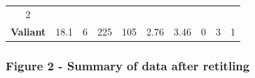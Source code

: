 \documentclass[]{article}
\begin{document}
\begin{longtable}[c]{@{}cccccccccc@{}}
\begin{minipage}[t]{0.06\columnwidth}
2
\strut\end{minipage}\tabularnewline
\begin{minipage}[t]{0.22\columnwidth}\centering\strut
\textbf{Valiant}
\strut\end{minipage} &
\begin{minipage}[t]{0.06\columnwidth}\centering\strut
18.1
\strut\end{minipage} &
\begin{minipage}[t]{0.06\columnwidth}\centering\strut
6
\strut\end{minipage} &
\begin{minipage}[t]{0.06\columnwidth}\centering\strut
225
\strut\end{minipage} &
\begin{minipage}[t]{0.05\columnwidth}\centering\strut
105
\strut\end{minipage} &
\begin{minipage}[t]{0.06\columnwidth}\centering\strut
2.76
\strut\end{minipage} &
\begin{minipage}[t]{0.06\columnwidth}\centering\strut
3.46
\strut\end{minipage} &
\begin{minipage}[t]{0.05\columnwidth}\centering\strut
0
\strut\end{minipage} &
\begin{minipage}[t]{0.06\columnwidth}\centering\strut
3
\strut\end{minipage} &
\begin{minipage}[t]{0.06\columnwidth}\centering\strut
1
\strut\end{minipage}\tabularnewline
\bottomrule
\end{longtable}

\subsubsection{Figure 2 - Summary of data after
retitling}\label{figure-2---summary-of-data-after-retitling}
\end{document}
